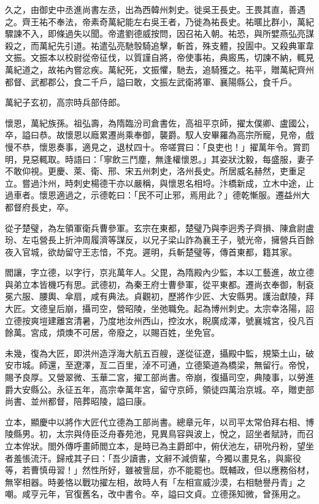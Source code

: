 \begin{pinyinscope}
 久之，由御史中丞進尚書左丞，出為西韓州刺史。徙吳王長史。王畏其直，善遇之。齊王祐不奉法，帝素奇萬紀能左右吳王者，乃徙為祐長史。祐暱比群小，萬紀驟諫不入，即條過失以聞。帝遣劉德威按問，因召祐入朝。祐恐，與所嬖燕弘亮謀殺之，而萬紀先引道。祐遣弘亮馳彀騎追擊，斬首，殊支體，投圊中。又殺典軍韋文振。文振本以校尉從帝征伐，以質謹自將，帝使事祐，典廄馬，切諫不納，輒見萬紀道之，故祐內嘗忿疾。萬紀死，文振懼，馳去，追騎獲之。祐平，贈萬紀齊州都督、武都郡公，食二千戶，謚曰敢，文振左武衛將軍、襄陽縣公，食千戶。



 萬紀子玄初，高宗時兵部侍郎。



 懷恩，萬紀族孫。祖弘壽，為隋臨汾司倉書佐，高祖平京師，擢太僕卿、盧國公，卒，謚曰恭。故懷恩以廕累遷尚乘奉御，襲爵。馭人安畢羅為高宗所寵，見帝，戲慢不恭，懷恩奏事，適見之，退杖四十。帝嗟賞曰：「良吏也！」擢萬年令。賞罰明，見惡輒取。時語曰：「寧飲三鬥塵，無逢權懷恩。」其姿狀沈毅，每盛服，妻子不敢仰視。更慶、萊、衛、邢、宋五州刺史，洛州長史。所居威名赫然，吏重足立。嘗過汴州，時刺史楊德干亦以嚴稱，與懷恩名相埒。汴橋新成，立木中途，止過車者。懷恩適過之，示德乾曰：「民不可止邪，焉用此？」德乾慚服。遷益州大都督府長史，卒。



 從子楚璧，為左領軍衛兵曹參軍。玄宗在東都，楚璧乃與李迥秀子齊損、陳倉尉盧玢、左屯營長上折沖周履濟等謀反，以兄子梁山詐為襄王子，號光帝，擁營兵百餘夜入官城，欲劫留守王志愔，不克。遲明，兵斬楚璧等，傳首東都，籍其家。



 閻讓，字立德，以字行，京兆萬年人。父毘，為隋殿內少監，本以工藝進，故立德與弟立本皆機巧有思。武德初，為秦王府士曹參軍，從平東都。遷尚衣奉御，制袞冕六服、腰輿、傘扇，咸有典法。貞觀初，歷將作少匠、大安縣男。護治獻陵，拜大匠。文德皇后崩，攝司空，營昭陵，坐弛職免。起為博州刺史。太宗幸洛陽，詔立德按爽塏建離宮清暑，乃度地汝州西山，控汝水，睨廣成澤，號襄城宮，役凡百餘萬。宮成，煩燠不可居，帝廢之，以賜百姓，坐免官。



 未幾，復為大匠，即洪州造浮海大航五百艘，遂從征遼，攝殿中監，規築土山，破安市城。師還，至遼澤，亙二百里，淖不可通，立德築道為橋梁，無留行。帝悅，賜予良厚。又營翠微、玉華二宮，擢工部尚書。帝崩，復攝司空，典陵事，以勞進爵大安縣公。永征五年，高宗幸萬年宮，留守京師，領徒四萬治京城。卒，贈吏部尚書、並州都督，陪葬昭陵，謚曰康。



 立本，顯慶中以將作大匠代立德為工部尚書。總章元年，以司平太常伯拜右相、博陵縣男。初，太宗與侍臣泛舟春苑池，見異鳥容與波上，悅之，詔坐者賦詩，而召立本侔狀。閤外傳呼畫師閻立本，是時已為主爵郎中，俯伏池左，研吮丹粉，望坐者羞悵流汗。歸戒其子曰：「吾少讀書，文辭不減儕輩，今獨以畫見名，與廝役等，若曹慎毋習！」然性所好，雖被訾屈，亦不能罷也。既輔政，但以應務俗材，無宰相器。時姜恪以戰功擢左相，故時人有「左相宣威沙漠，右相馳譽丹青」之嘲。咸亨元年，官復舊名，改中書令。卒，謚曰文貞。立德孫知微，曾孫用之。




\end{pinyinscope}
